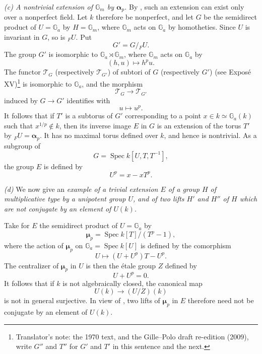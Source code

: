 \smallskip
\noindent
\emph{(c) A nontrivial extension of \(\mathbb G_m\) by
\(\boldsymbol\alpha_p\).}
By , such an extension can exist only over a
nonperfect field.  Let \(k\) therefore be nonperfect, and let
\(G\) be the semidirect product of \(U=\mathbb G_a\) by
\(H=\mathbb G_m\), where \(\mathbb G_m\) acts on
\(\mathbb G_a\) by homotheties.  Since \(U\) is invariant in
\(G\), so is \({}_{F}U\).  Put
\[
  G'=G/{}_{F}U.
\]
The group \(G'\) is isomorphic to
\(\mathbb G_a\rtimes\mathbb G_m\), where \(\mathbb G_m\) acts on
\(\mathbb G_a\) by
\[
  (h,u)\longmapsto h^p u.
\]
The functor \(\mathscr T_G\) (respectively
\(\mathscr T_{G'}\)) of subtori of \(G\) (respectively \(G'\))
(see Exposé XV)\footnote{Translator's note: the 1970 text, and the Gille--Polo draft re-edition (2009), write
\(G''\) and \(T''\) for \(G'\) and \(T'\) in this sentence and the next.} is isomorphic to
\(\mathbb G_a\), and the morphism
\[
  \mathscr T_G\longrightarrow\mathscr T_{G'}
\]
induced by \(G\longrightarrow G'\) identifies with
\[
  u\longmapsto u^p.
\]
It follows that if \(T'\) is a subtorus of \(G'\) corresponding
to a point \(x\in k\simeq\mathbb G_a(k)\) such that
\(x^{1/p}\notin k\), then its inverse image \(E\) in \(G\) is an
extension of the torus \(T'\) by
\({}_{F}U=\boldsymbol\alpha_p\).  It has no maximal torus defined
over \(k\), and hence is nontrivial.  As a subgroup of
\[
  G=\operatorname{Spec}k[U,T,T^{-1}],
\]
the group \(E\) is defined by
\[
  U^p=x-xT^p.
\]


\smallskip
\noindent
\emph{(d)} We now give an \emph{example of a trivial extension \(E\) of a group
\(H\) of multiplicative type by a unipotent group \(U\), and of
two lifts \(H'\) and \(H''\) of \(H\) which are not conjugate by
an element of \(U(k)\).}

Take for \(E\) the semidirect product of \(U=\mathbb G_a\) by
\[
  \boldsymbol\mu_p
  =\operatorname{Spec}k[T]/(T^p-1),
\]
where the action of \(\boldsymbol\mu_p\) on
\(\mathbb G_a=\operatorname{Spec}k[U]\) is defined by the
comorphism
\[
  U\longmapsto(U+U^p)T-U^p.
\]
The centralizer of \(\boldsymbol\mu_p\) in \(U\) is then the
étale group \(Z\) defined by
\[
  U+U^p=0.
\]
It follows that if \(k\) is not algebraically closed, the
canonical map
\[
  U(k)\longrightarrow(U/Z)(k)
\]
is not in general surjective.  In view of , two
lifts of \(\boldsymbol\mu_p\) in \(E\) therefore need not be
conjugate by an element of \(U(k)\).

